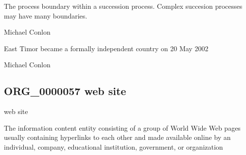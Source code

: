 \documentclass[letterpaper,10pt,english]{sphinxmanual}
\begin{document}
\begin{sphinxShadowBox}

\sphinxAtStartPar
The process boundary within a succession process.  Complex succesion processes may have many boundaries.
\end{sphinxShadowBox}

\begin{sphinxShadowBox}

\sphinxAtStartPar
Michael Conlon 
\end{sphinxShadowBox}

\begin{sphinxShadowBox}

\sphinxAtStartPar
East Timor became a formally independent country on 20 May 2002
\end{sphinxShadowBox}

\begin{sphinxShadowBox}

\sphinxAtStartPar
Michael Conlon 
\end{sphinxShadowBox}
\begin{quote}

\ignorespaces \end{quote}


\subsection{ORG\_0000057 \sphinxhyphen{} web site}
\label{\detokenize{doc-ORG_0000057:org-0000057-web-site}}\label{\detokenize{doc-ORG_0000057:index-0}}\label{\detokenize{doc-ORG_0000057::doc}}
\begin{sphinxShadowBox}

\sphinxAtStartPar
web site
\end{sphinxShadowBox}

\begin{sphinxShadowBox}

\sphinxAtStartPar
The information content entity consisting of a group of World Wide Web pages usually containing hyperlinks to each other and made available online by an individual, company, educational institution, government, or organization
\end{sphinxShadowBox}
\end{document}
